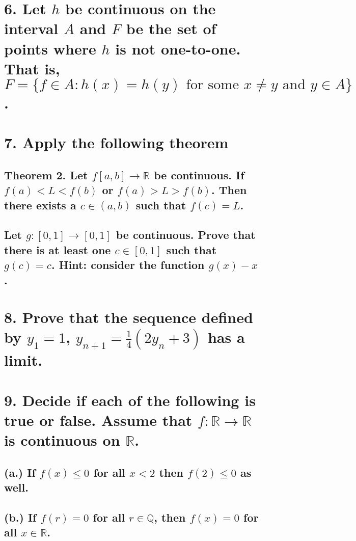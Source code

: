 \documentclass{article}
\begin{document}
\subsection*{}

\section*{6. Let $h$ be continuous on the interval $A$ and $F$ be the set of points where $h$ is not one-to-one. That is,
 $F = \{f \in A : h(x) = h(y) \text{ for some } x \ne y \text{ and } y \in A\}$. }
\subsection*{}

\section*{7. Apply the following theorem}
\subsection*{Theorem 2. Let $f[a,b] \to \mathbb{R}$ be continuous. If $f(a)<L<f(b)$ or $f(a) > L > f(b)$. Then there exists a $c \in (a,b)$ such that $f(c) = L$.}
\subsection*{Let $g : [0,1] \to [0,1]$ be continuous. Prove that there is at least one $c \in [0,1]$ such that $g(c) = c$. Hint: consider the function $g(x) -x$.}

\section*{8. Prove that the sequence defined by $y_1 = 1$, $y_{n+1} = \frac{1}{4}(2y_n +3)$ has a limit.}

\section*{9. Decide if each of the following is true or false. Assume that $f:\mathbb{R} \to \mathbb{R}$ is continuous on $\mathbb{R}$.}
\subsection*{(a.) If $f(x) \le 0$ for all $x < 2$ then $f(2) \le 0$ as well.}
\subsection*{(b.) If $f(r) = 0$ for all $r \in \mathbb{Q}$, then $f(x) =0$ for all $x \in \mathbb{R}$.}
\end{document}

